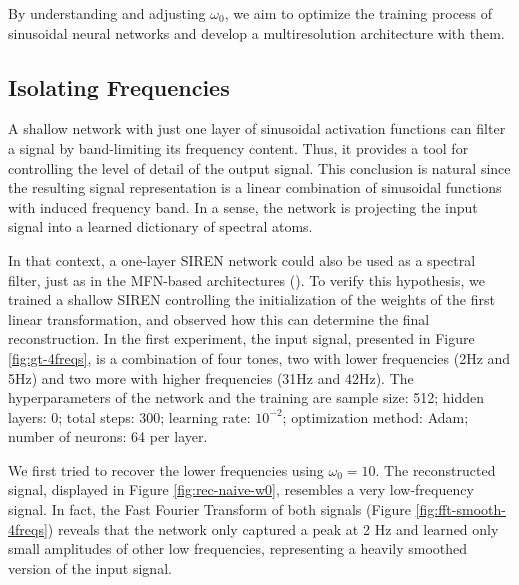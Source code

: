 By understanding and adjusting \(\omega_0\), we aim to optimize the training process of sinusoidal neural networks and develop a multiresolution architecture with them.


\subsection{Isolating Frequencies}

A shallow network with just one layer of sinusoidal activation functions can filter a signal by band-limiting its frequency content. Thus, it provides a tool for controlling the level of detail of the output signal. This conclusion is natural since the resulting signal representation is a linear combination of sinusoidal functions with induced frequency band. In a sense, the network is projecting the input signal into a learned dictionary of spectral atoms.

In that context, a one-layer SIREN network could also be used as a spectral filter, just as in the MFN-based architectures (\cite{fathony2020multiplicative}). To verify this hypothesis, we trained a shallow SIREN controlling the initialization of the weights of the first linear transformation, and observed how this can determine the final reconstruction. In the first experiment, the input signal, presented in Figure \ref{fig:gt-4freqs}, is a combination of four tones, two with lower frequencies (2Hz and 5Hz) and two more with higher frequencies (31Hz and 42Hz). The hyperparameters of the network and the training are sample size: 512; hidden layers: 0; total steps: 300; learning rate: $10^{-2}$; optimization method: Adam; number of neurons: 64 per layer. 

We first tried to recover the lower frequencies using $\omega_0=10$. The reconstructed signal, displayed in Figure \ref{fig:rec-naive-w0}, resembles a very low-frequency signal. In fact, the Fast Fourier Transform of both signals (Figure \ref{fig:fft-smooth-4freqs}) reveals that the network only captured a peak at 2 Hz and learned only small amplitudes of other low frequencies, representing a heavily smoothed version of the input signal.

